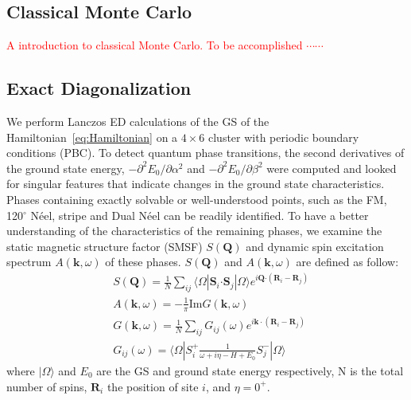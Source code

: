 \documentclass[aps,prb,reprint,amsfonts,amsmath,amssymb,showpacs,groupedaddress,superscriptaddress]{revtex4-1}
\begin{document}
\subsection{\label{sec:SectionIIA}Classical Monte Carlo}
\textcolor{red}{A introduction to classical Monte Carlo. To be accomplished $\cdots \cdots$}

\subsection{\label{sec:SectionIIB}Exact Diagonalization}
We perform Lanczos ED calculations of the GS of the Hamiltonian~\eqref{eq:Hamiltonian} on a $4 \times 6$ cluster with periodic boundary conditions (PBC). To detect quantum phase transitions, the second derivatives of the ground state energy, $-\partial^2E_0/\partial\alpha^2$ and $-\partial^2E_0/\partial\beta^2$ were computed and looked for singular features that indicate changes in the ground state characteristics. Phases containing exactly solvable or well-understood points, such as the FM, 120$^\circ$ N\'{e}el, stripe and Dual N\'{e}el can be readily identified. To have a better understanding of the characteristics of the remaining phases, we examine the static magnetic structure factor (SMSF) $S(\bm{Q})$ and dynamic spin excitation spectrum $A(\bm{k}, \omega)$ of these phases. $S(\bm{Q})$ and $A(\bm{k}, \omega)$ are defined as follow:
\begin{subequations}
    \begin{align}
        & S(\bm{Q}) = \frac{1}{N} \sum_{ij} \langle \Omega | \bm{S}_i \bm{\cdot} \bm{S}_j | \Omega \rangle e^{i \bm{Q} \bm{\cdot} (\bm{R}_i - \bm{R}_j)} \label{eq:SMSF} \\
        & A(\bm{k}, \omega) = -\frac{1}{\pi} \text{Im} G(\bm{k}, \omega) \label{eq:Akomega} \\
        & G(\bm{k}, \omega) = \frac{1}{N} \sum_{ij} G_{ij}(\omega) e^{i \bm{k} \cdot (\bm{R}_i - \bm{R}_j)} \\
        & G_{ij}(\omega) = \langle \Omega | S_i^{+} \frac{1}{\omega + i\eta - H + E_0} S_j^{-} | \Omega \rangle \label{eq:GreenFunction}
    \end{align}
\end{subequations}
where $| \Omega \rangle$ and $E_0$ are the GS and ground state energy respectively, N is the total number of spins, $\bm{R}_i$ the position of site $i$, and $\eta = 0^+$.
\end{document}
